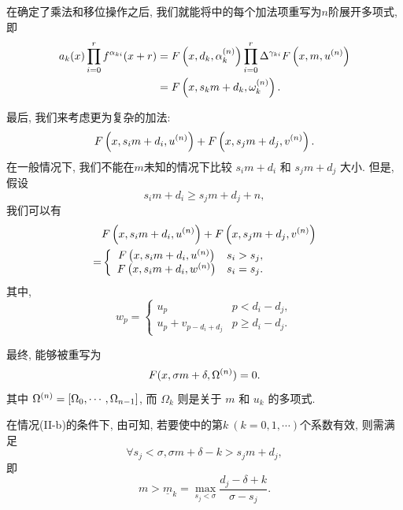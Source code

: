 在确定了乘法和移位操作之后, 我们就能将中的每个加法项重写为$n$阶展开多项式, 即
\begin{equation}
\begin{split}
a_k(x)\prod_{i=0}^r{f^{\alpha_{ki}}(x+r)}&=F\left(x,d_k,\alpha_k^{(n)}\right)\prod_{i=0}^r{\Delta^{\gamma_{ki}}F\left(x,m,u^{(n)}\right)} \\
&= F\left(x,s_k m+d_k, \omega_k^{(n)}\right) .
\end{split}
\end{equation}

最后, 我们来考虑更为复杂的加法: 
\begin{equation}
F\left(x,s_i m+d_i,u^{(n)}\right)+F\left(x,s_j m+d_j,v^{(n)}\right).
\end{equation}
在一般情况下, 我们不能在$m$未知的情况下比较 $s_i m + d_i$ 和 $s_j m + d_j$ 大小. 但是, 假设
\begin{equation}
s_i m+d_i\ge s_j m+d_j+n, \label{cond_add}
\end{equation}
我们可以有 
\begin{equation}
\begin{split}
&F\left(x,s_i m+d_i,u^{(n)}\right)+F\left(x,s_j m+d_j,v^{(n)}\right) \\
=&\left\{
\begin{array}{cl}
    F\left(x,s_i m+d_i,u^{(n)}\right) & s_i>s_j,            \\
    F\left(x,s_i m+d_i,w^{(n)}\right) & s_i=s_j.
\end{array}
\right.
\end{split} \label{NEM-add}
\end{equation}
其中,
\begin{equation}
w_p=\left\{
\begin{array}{cl}
u_p               & p<d_i-d_j ,   \\
u_p+v_{p-d_i+d_j} & p\ge d_i-d_j.
\end{array}
\right.
\end{equation}

最终,  能够被重写为
\begin{equation}
F(x,\sigma m + \delta,\Omega^{(n)})=0. 
\label{eq-np}
\end{equation}
其中 $\Omega^{(n)}=\left[\Omega_0,\cdots,\Omega_{n-1}\right]$, 而 $\Omega_k$ 则是关于 $m$ 和 $u_k$ 的多项式.

在情况(II-b)的条件下, 由可知, 若要使中的第$k~(k=0,1,\cdots)$个系数有效, 则需满足 
\begin{equation}
\forall s_j<\sigma, \sigma m + \delta - k > s_j m + d_j,
\end{equation}
即
\begin{equation}
m > \underline{m}_k=\underset{s_j<\sigma}{\max}{\frac{d_j-\delta+k}{\sigma-s_j}}.
\end{equation}

